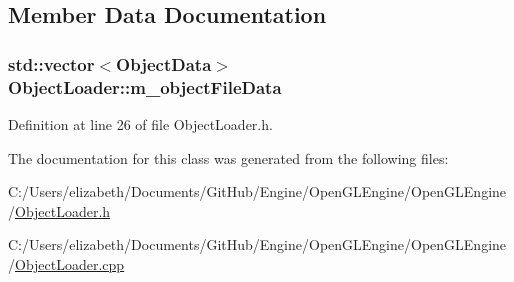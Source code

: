 \subsection{Member Data Documentation}
\subsubsection[{\texorpdfstring{m\+\_\+object\+File\+Data}{m_objectFileData}}]{\setlength{\rightskip}{0pt plus 5cm}std\+::vector$<${\bf Object\+Data}$>$ Object\+Loader\+::m\+\_\+object\+File\+Data}\hypertarget{class_object_loader_a3110eee250161ee33d7ac24f23489d11}{}\label{class_object_loader_a3110eee250161ee33d7ac24f23489d11}


Definition at line 26 of file Object\+Loader.\+h.



The documentation for this class was generated from the following files\+:\begin{DoxyCompactItemize}
\item 
C\+:/\+Users/elizabeth/\+Documents/\+Git\+Hub/\+Engine/\+Open\+G\+L\+Engine/\+Open\+G\+L\+Engine/\hyperlink{_object_loader_8h}{Object\+Loader.\+h}\item 
C\+:/\+Users/elizabeth/\+Documents/\+Git\+Hub/\+Engine/\+Open\+G\+L\+Engine/\+Open\+G\+L\+Engine/\hyperlink{_object_loader_8cpp}{Object\+Loader.\+cpp}\end{DoxyCompactItemize}
